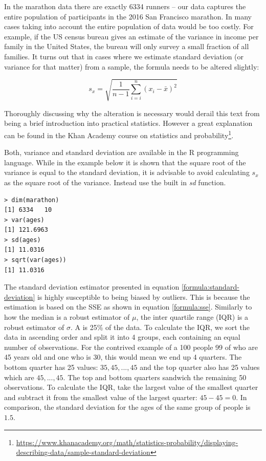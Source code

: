 \documentclass{tufte-book} %
\begin{document}
In the marathon data there are exactly 6334 runners -- our data captures the entire population of participants in the 2016 San Francisco marathon. In many cases taking into account the entire population of data would be too costly. For example, if the US census bureau gives an estimate of the variance in income per family in the United States, the bureau will only survey a small fraction of all families. It turns out that in cases where we estimate standard deviation (or variance for that matter) from a sample, the formula needs to be altered slightly:

\begin{equation} \label{formula:sample-standard-deviation}
	s_x = \sqrt{\frac{1}{n - 1} \sum_{i=i}^{n} (x_i - \bar{x})^2}
\end{equation}

Thoroughly discussing why the alteration is necessary would derail this text from being a brief introduction into practical statistics. However a great explanation can be found in the Khan Academy course on statistics and probability\footnote{\url{https://www.khanacademy.org/math/statistics-probability/displaying-describing-data/sample-standard-deviation}}.

Both, variance and standard deviation are available in the R programming language. While in the example below it is shown that the square root of the variance is equal to the standard deviation, it is advisable to avoid calculating $s_x$ as the square root of the variance. Instead use the built in {\em sd} function.

\begin{Verbatim}
> dim(marathon)
[1] 6334   10
> var(ages)
[1] 121.6963
> sd(ages)
[1] 11.0316
> sqrt(var(ages))
[1] 11.0316
\end{Verbatim}

The standard deviation estimator presented in equation \ref{formula:standard-deviation} is highly susceptible to being biased by outliers. This is because the estimation is based on the SSE as shown in equation \ref{formula:sse}. Similarly to how the median is a robust estimator of $\mu$, the inter quartile range (IQR) is a robust estimator of $\sigma$. A is 25\% of the data. To calculate the IQR, we sort the data in ascending order and split it into 4 groups, each containing an equal number of observations. For the contrived example of a 100 people 99 of who are 45 years old and one who is 30, this would mean we end up 4 quarters. The bottom quarter has 25 values: $35, 45, ..., 45$ and the top quarter also has 25 values which are $45,...,45$. The top and bottom quarters sandwich the remaining 50 observations. To calculate the IQR, take the largest value of the smallest quarter and subtract it from the smallest value of the largest quarter: $45 - 45 = 0$. In comparison, the standard deviation for the ages of the same group of people is $1.5$.
\end{document}
